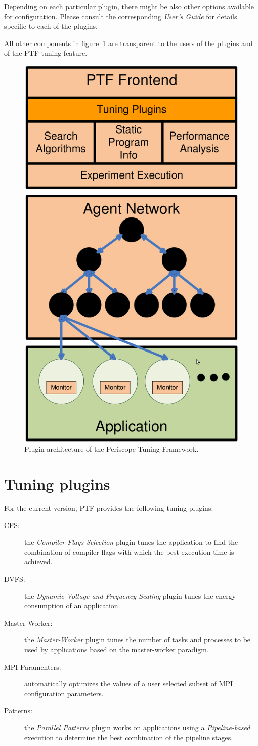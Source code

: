 \documentclass[11pt,oneside,a4paper]{book}
\begin{document}
Depending on each particular plugin, there might be also other options available for configuration. Please consult the corresponding \textit{User's Guide} for details specific to each of the plugins.

All other components in figure~\ref{fig:ptf-architecture} are transparent to the users of the plugins and of the PTF tuning feature.
\begin{figure}[bth]
	\centering
	\includegraphics[width=.5\linewidth]{images/ptf-architecture}
	\caption{Plugin architecture of the Periscope Tuning Framework.}
	\label{fig:ptf-architecture}
\end{figure}


\section{Tuning plugins}
For the current version, PTF provides the following tuning plugins:

\begin{description}
\item[CFS:] the \textit{Compiler Flags Selection} plugin tunes the application to find the combination of compiler flags with which the best execution time is achieved.
\item[DVFS:] the \textit{Dynamic Voltage and Frequency Scaling} plugin tunes the energy consumption of an application.
\item[Master-Worker:] the \textit{Master-Worker} plugin tunes the number of tasks and processes to be used by applications based on the master-worker paradigm.
\item[MPI Paramenters:] automatically optimizes the values of a user selected subset of MPI configuration parameters.
\item[Patterns:] the \textit{Parallel Patterns} plugin works on applications using a \textit{Pipeline-based} execution to determine the best combination of the pipeline stages.
\end{description}
\end{document}
